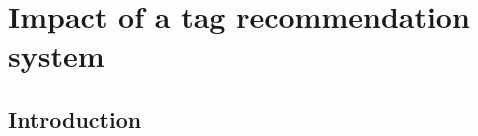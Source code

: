 
\chapter[Impact of a tag recommendation system][Impact of a tag rec. system]{Impact of a tag recommendation system}
\label{sec:impact}

\section{Introduction}
\label{impact:sec:introduction}




